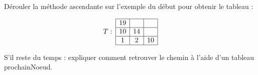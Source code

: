 \begin{com}
	Dérouler la méthode ascendante sur l'exemple du début pour obtenir le tableau : 
\end{com} 

$$ T : \: \begin{array}{|c|c|c|}
	\hline
	19 &  &  \\ \hline
	10 & 14 &  \\ \hline
	1 & 2 & 10 \\ \hline
\end{array}
$$

\begin{com}
	S'il reste du temps : expliquer comment retrouver le chemin à l'aide d'un tableau prochainNoeud.
\end{com} 
